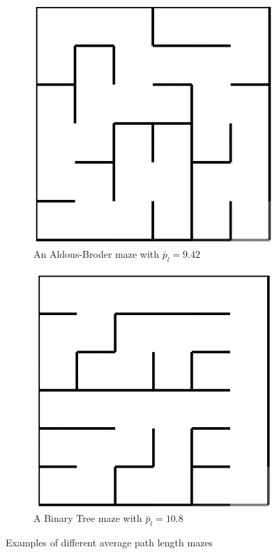 \begin{description}[style=unboxed]
\begin{figure}[!h]
\centering
\begin{subfigure}{.5\textwidth}
\centering
\includegraphics[width=.5\linewidth]{aldous}
\caption{An Aldous-Broder maze with $\bar{p}_l = 9.42$}
\label{fig:sub1}
\end{subfigure}%
\begin{subfigure}{.5\textwidth}
\centering
\includegraphics[width=.5\linewidth]{binary}
\caption{A Binary Tree maze with $\bar{p}_l = 10.8$}
\label{fig:sub2}
\end{subfigure}
\caption{Examples of different average path length mazes}
\label{fig:test}
\end{figure}


\end{description}
